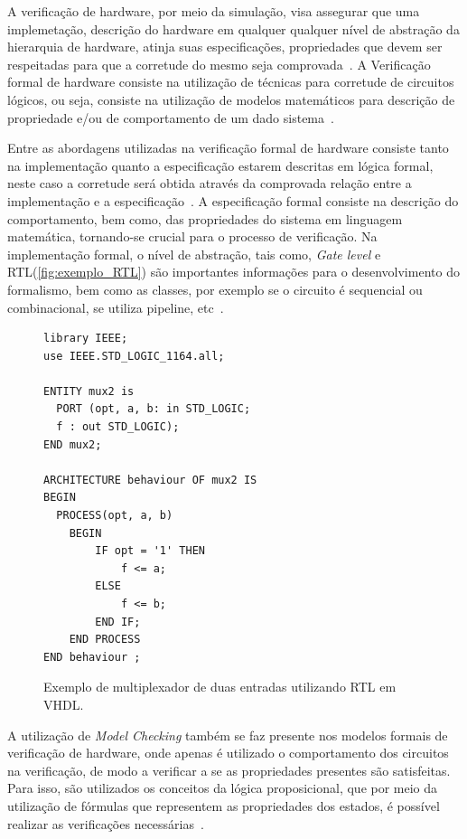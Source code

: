 A verificação de hardware, por meio da simulação, visa assegurar que uma implemetação, descrição do hardware em qualquer qualquer nível de abstração da hierarquia de hardware, atinja suas especificações, propriedades que devem ser respeitadas para que a corretude do mesmo seja comprovada~\cite{gupta1992formal}. A Verificação formal de hardware consiste na utilização 
de técnicas para corretude de circuitos lógicos, ou seja, consiste na utilização de modelos matemáticos para descrição de propriedade e/ou de comportamento de um dado sistema~\cite{kropf2013introduction}.

\par
Entre as abordagens utilizadas na verificação formal de hardware consiste tanto na implementação quanto a especificação estarem descritas em lógica formal, neste caso a corretude será obtida através da comprovada relação entre a implementação e a especificação~\cite{seger1992introduction}. A especificação formal consiste na descrição do comportamento, bem como, das propriedades do sistema em linguagem matemática, tornando-se crucial para o processo de verificação. Na implementação formal, o nível de abstração, tais como, \textit{Gate level} e RTL(\autoref{fig:exemplo_RTL}) são importantes informações para o desenvolvimento do formalismo, bem como as classes, por exemplo se o circuito é sequencial ou combinacional, se utiliza pipeline, etc~\cite{kropf2013introduction}.

\begin{figure}[!htp]
\caption{\label{fig:exemplo_RTL} Exemplo de multiplexador de duas entradas utilizando RTL em VHDL.}
	\begin{center}
    \begin{minipage}{0.7\textwidth}
    \begin{lstlisting}       
library IEEE;
use IEEE.STD_LOGIC_1164.all;

ENTITY mux2 is
  PORT (opt, a, b: in STD_LOGIC;
  f : out STD_LOGIC);
END mux2;

ARCHITECTURE behaviour OF mux2 IS
BEGIN
  PROCESS(opt, a, b)
    BEGIN
        IF opt = '1' THEN
            f <= a;
        ELSE
            f <= b;
        END IF;
    END PROCESS
END behaviour ; 
\end{lstlisting}
    \end{minipage}
	\end{center}
\end{figure}

\par
A utilização de \textit{Model Checking} também se faz presente nos modelos formais de verificação de hardware, onde apenas é utilizado o comportamento dos circuitos na verificação, de modo a verificar a se as propriedades  presentes são satisfeitas. Para isso, são utilizados os conceitos da lógica proposicional, que por meio da utilização de fórmulas que representem as propriedades dos estados, é possível realizar as verificações necessárias~\cite{seger1992introduction}.

